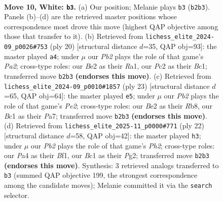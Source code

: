 \documentclass[11pt]{article}
\begin{document}
\clearpage

\begin{figure}[p]\centering
\begin{subfigure}{0.46\textwidth}\centering
\resizebox{\linewidth}{!}{%
\newchessgame
\chessboard[
  setfen={rnbqk2r/1p2bppp/p2p1n2/4p3/P3P3/2N2N2/1PP1BPPP/R1BQ1RK1 w kq - 1 10},
  showmover=false,
  pgfstyle=straightmove, color=movearrow, markmove={b2-b3}
]}
\caption{}
\end{subfigure}\hfill
\begin{subfigure}{0.46\textwidth}\centering
\resizebox{\linewidth}{!}{%
\newchessgame
\chessboard[
  setfen={rn1qk2r/1b2bpp1/p2p1n2/1p2p2p/4P3/2N3PP/PPP1NPB1/R1BQ1RK1 w kq - 2 11},
  showmover=false,
  pgfstyle=straightmove, color=movearrow, markmove={a2-a4}
]}
\caption{}
\end{subfigure}
\\[4pt]
\begin{subfigure}{0.46\textwidth}\centering
\resizebox{\linewidth}{!}{%
\newchessgame
\chessboard[
  setfen={1r1q1rk1/p1p1ppbp/2n2np1/5b2/3P4/P1N1PN2/1P3PPP/R1BQKB1R b KQ - 0 12},
  showmover=false,
  pgfstyle=straightmove, color=movearrow, markmove={e7-e5}
]}
\caption{}
\end{subfigure}\hfill
\begin{subfigure}{0.46\textwidth}\centering
\resizebox{\linewidth}{!}{%
\newchessgame
\chessboard[
  setfen={r2qk2r/1p2bppp/p2pbn2/4n3/4PB2/1NN5/PPPQ2PP/2KR1B1R w kq - 5 12},
  showmover=false,
  pgfstyle=straightmove, color=movearrow, markmove={h2-h3}
]}
\caption{}
\end{subfigure}
\caption{\textbf{Move 10, White: \texttt{b3}.} (a) Our position; Melanie plays \texttt{b3} (\texttt{b2b3}). Panels (b)--(d) are the retrieved master positions whose correspondence most drove this move (highest QAP objective among those that transfer to it). (b) Retrieved from \texttt{lichess\_elite\_2024-09\_p0026\#753} (ply 20) [structural distance $d$=35, QAP obj=93]: the master played \texttt{a4}; under $\mu$ our \emph{Pb2} plays the role of that game's \emph{Pa2}; cross-type roles: our \emph{B}e2 as their \emph{R}a1, our \emph{P}c2 as their \emph{B}c1; transferred move \texttt{b2b3} \textbf{(endorses this move)}. (c) Retrieved from \texttt{lichess\_elite\_2024-09\_p0010\#1857} (ply 23) [structural distance $d$=65, QAP obj=64]: the master played \texttt{e5}; under $\mu$ our \emph{Pb2} plays the role of that game's \emph{Pe2}; cross-type roles: our \emph{B}e2 as their \emph{R}b8, our \emph{B}c1 as their \emph{P}a7; transferred move \texttt{b2b3} \textbf{(endorses this move)}. (d) Retrieved from \texttt{lichess\_elite\_2025-11\_p0000\#771} (ply 22) [structural distance $d$=58, QAP obj=42]: the master played \texttt{h3}; under $\mu$ our \emph{Pb2} plays the role of that game's \emph{Ph2}; cross-type roles: our \emph{P}a4 as their \emph{B}f1, our \emph{B}c1 as their \emph{P}g2; transferred move \texttt{b2b3} \textbf{(endorses this move)}. Synthesis: 3 retrieved analogs transferred to \texttt{b3} (summed QAP objective 199, the strongest correspondence among the candidate moves); Melanie committed it via the \texttt{search} selector.}
\label{fig:thought-m18}
\end{figure}
\end{document}
